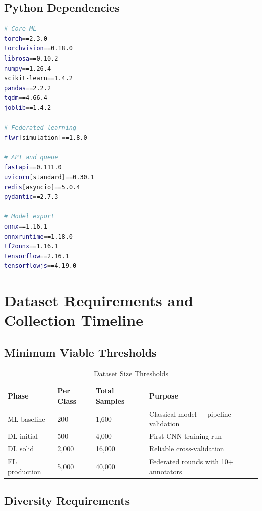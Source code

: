 \documentclass[11pt,a4paper]{article}
\begin{document}
\subsection{Python Dependencies}

\begin{lstlisting}[language=bash, caption={requirements.txt}]
# Core ML
torch==2.3.0
torchvision==0.18.0
librosa==0.10.2
numpy==1.26.4
scikit-learn==1.4.2
pandas==2.2.2
tqdm==4.66.4
joblib==1.4.2

# Federated learning
flwr[simulation]==1.8.0

# API and queue
fastapi==0.111.0
uvicorn[standard]==0.30.1
redis[asyncio]==5.0.4
pydantic==2.7.3

# Model export
onnx==1.16.1
onnxruntime==1.18.0
tf2onnx==1.16.1
tensorflow==2.16.1
tensorflowjs==4.19.0
\end{lstlisting}

\section{Dataset Requirements and Collection Timeline}

\subsection{Minimum Viable Thresholds}

\begin{table}[h]
\centering
\caption{Dataset Size Thresholds}
\begin{tabular}{@{}p{4cm}p{3cm}p{3cm}p{3.5cm}@{}}
\toprule
\textbf{Phase} & \textbf{Per Class} & \textbf{Total Samples} & \textbf{Purpose} \\
\midrule
ML baseline   & 200  & 1,600  & Classical model + pipeline validation \\
DL initial    & 500  & 4,000  & First CNN training run \\
DL solid      & 2,000 & 16,000 & Reliable cross-validation \\
FL production & 5,000 & 40,000 & Federated rounds with 10+ annotators \\
\bottomrule
\end{tabular}
\end{table}

\subsection{Diversity Requirements}
\end{document}
